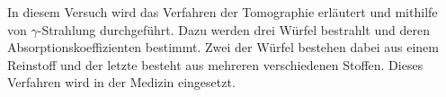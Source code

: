 In diesem Versuch wird das Verfahren der Tomographie erläutert und mithilfe von $\gamma$-Strahlung durchgeführt.
Dazu werden drei Würfel bestrahlt und deren Absorptionskoeffizienten bestimmt.
Zwei der Würfel bestehen dabei aus einem Reinstoff und der letzte besteht aus mehreren verschiedenen Stoffen.
Dieses Verfahren wird in der Medizin eingesetzt.
